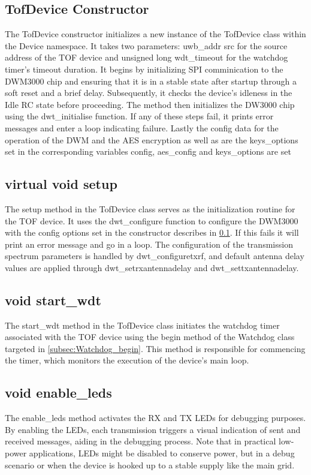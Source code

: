 \subsection{TofDevice Constructor}
\label{subsec:TofDevice_Constructor}
The TofDevice constructor initializes a new instance of the TofDevice class within the Device namespace. It takes two parameters: uwb\_addr src for the source address of the TOF device and unsigned long wdt\_timeout for the watchdog timer's timeout duration. 
It begins by initializing SPI comminication to the DWM3000 chip and ensuring that it is in a stable state after startup through a soft reset and a brief delay. 
Subsequently, it checks the device's idleness in the Idle RC state before proceeding. 
The method then initializes the DW3000 chip using the dwt\_initialise function. 
If any of these steps fail, it prints error messages and enter a loop indicating failure. 
Lastly the config data for the operation of the DWM and the AES encryption as well as are the keys\_options set in the corresponding variables config, aes\_config and keys\_options are set

\subsection{virtual void setup}
\label{subsec:TofDevice_setup}
The setup method in the TofDevice class serves as the initialization routine for the TOF device. 
It uses the dwt\_configure function to configure the DWM3000 with the config options set in the constructor describes in \ref{subsec:TofDevice_Constructor}. 
If this fails it will print an error message and go in a loop. 
The configuration of the transmission spectrum parameters is handled by dwt\_configuretxrf, and default antenna delay values are applied through dwt\_setrxantennadelay and dwt\_settxantennadelay. 

\subsection{void start\_wdt}
\label{subsec:TofDevice_start_wdt}
The start\_wdt method in the TofDevice class initiates the watchdog timer associated with the TOF device using the begin method of the Watchdog class targeted in \ref{subsec:Watchdog_begin}. This method is responsible for commencing the timer, which monitors the execution of the device's main loop. 

\subsection{void enable\_leds}
\label{subsec:TofDevice_enable_leds}
The enable\_leds method activates the RX and TX LEDs for debugging purposes. 
By enabling the LEDs, each transmission triggers a visual indication of sent and received messages, aiding in the debugging process. Note that in practical low-power applications, LEDs might be disabled to conserve power, but in a debug scenario or when the device is hooked up to a stable supply like the main grid. 

